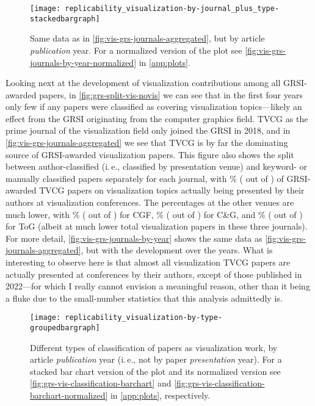 \documentclass[conference,svgnames]{vgtc}                     %
\newcommand{\ie}{i.\,e.}
\begin{document}
\begin{figure}
	\centering
	\texttt{[image: replicability\_visualization-by-journal\_plus\_type-stackedbargraph]}
	\caption{Same data as in \autoref{fig:vis-grs-journals-aggregated}, but by article \emph{publication} year. For a normalized version of the plot see \autoref{fig:vis-grs-journals-by-year-normalized} in \autoref{app:plots}.}
	\label{fig:vis-grs-journals-by-year}
\end{figure}

Looking next at the development of visualization contributions among all GRSI-awarded papers, in \autoref{fig:grs-split-vis-novis} we can see that in the first four years only few if any papers were classified as covering visualization topics---likely an effect from the GRSI originating from the computer graphics field. TVCG as the prime journal of the visualization field only joined the GRSI in 2018, and in \autoref{fig:vis-grs-journals-aggregated} we see that TVCG is by far the dominating source of GRSI-awarded visualization papers. This figure also shows the split between author-classified (\ie, classified by presentation venue) and keyword- or manually classified papers separately for each journal, with \GrsiVisPapersInIEEETVCGPercentagePresentation{}\% (\GrsiVisPapersInIEEETVCGPresentation{} out of \GrsiVisPapersInIEEETVCGTotal) of GRSI-awarded TVCG papers on visualization topics actually being presented by their authors at visualization conferences. The percentages at the other venues are much lower, with \GrsiVisPapersInWileyCGFPercentagePresentation{}\% (\GrsiVisPapersInWileyCGFPresentation{} out of \GrsiVisPapersInWileyCGFTotal) for CGF, \GrsiVisPapersInElsevierCaGPercentagePresentation{}\% (\GrsiVisPapersInElsevierCaGPresentation{} out of \GrsiVisPapersInElsevierCaGTotal) for C\&G, and \GrsiVisPapersInACMToGPercentagePresentation{}\% (\GrsiVisPapersInACMToGPresentation{} out of \GrsiVisPapersInACMToGTotal) for ToG (albeit at much lower total visualization papers in these three journals). For more detail, \autoref{fig:vis-grs-journals-by-year} shows the same data as \autoref{fig:vis-grs-journals-aggregated}, but with the development over the years. What is interesting to observe here is that almost all visualization TVCG papers are actually presented at conferences by their authors, except of those published in 2022---for which I really cannot envision a meaningful reason, other than it being a fluke due to the small-number statistics that this analysis admittedly is.

\begin{figure}
	\centering
	\texttt{[image: replicability\_visualization-by-type-groupedbargraph]}
	\caption{Different types of classification of papers as visualization work, by article \emph{publication} year (\ie, not by paper \emph{presentation} year). For a stacked bar chart version of the plot and its normalized version see \autoref{fig:grs-vis-classification-barchart} and \autoref{fig:grs-vis-classification-barchart-normalized} in \autoref{app:plots}, respectively.}
	\label{fig:grs-vis-classification}
\end{figure}
\end{document}
